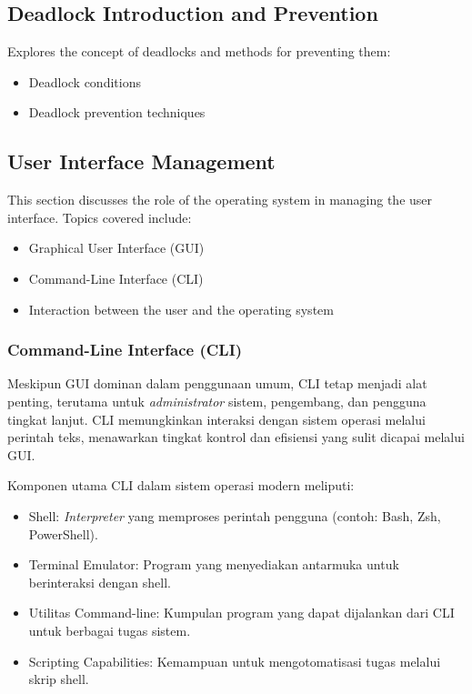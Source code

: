\documentclass[12pt]{article}
\begin{document}
\subsection{Deadlock Introduction and Prevention}
Explores the concept of deadlocks and methods for preventing them:
\begin{itemize}
    \item Deadlock conditions
    \item Deadlock prevention techniques
\end{itemize}

\subsection{User Interface Management}
This section discusses the role of the operating system in managing the user interface. Topics covered include:
\begin{itemize}
    \item Graphical User Interface (GUI)
    \item Command-Line Interface (CLI)
    \item Interaction between the user and the operating system
\end{itemize}
\subsubsection{Command-Line Interface (CLI)}
		
		Meskipun GUI dominan dalam penggunaan umum, CLI tetap menjadi alat penting, terutama untuk \textit{administrator} sistem, pengembang, dan pengguna tingkat lanjut. CLI memungkinkan interaksi dengan sistem operasi melalui perintah teks, menawarkan tingkat kontrol dan efisiensi yang sulit dicapai melalui GUI. \cite{Shotts2019}
		
		Komponen utama CLI dalam sistem operasi modern meliputi:
		\begin{itemize}
			\item Shell: \textit{Interpreter} yang memproses perintah pengguna (contoh: Bash, Zsh, PowerShell).
			\item Terminal Emulator: Program yang menyediakan antarmuka untuk berinteraksi dengan shell.
			\item Utilitas Command-line: Kumpulan program yang dapat dijalankan dari CLI untuk berbagai tugas sistem.
			\item Scripting Capabilities: Kemampuan untuk mengotomatisasi tugas melalui skrip shell.
		\end{itemize}
		
\end{document}
